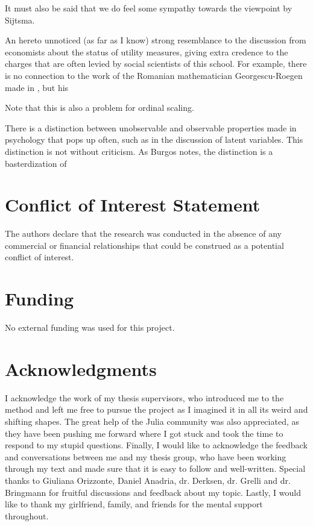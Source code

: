 \documentclass[utf8]{FrontiersinVancouver}
\begin{document}
It must also be said that we do feel some sympathy towards the viewpoint by Sijtsma\citep{sijtsmaPsychologicalMeasurementPhysics2012}. 

An hereto unnoticed (as far as I know) strong resemblance to the discussion from economists about the status of utility measures, giving extra credence to the charges that are often levied by social scientists of this school. For example, there is no connection to the work of the Romanian mathematician Georgescu-Roegen made in , but his 

Note that this is also a problem for ordinal scaling. 

There is a distinction between unobservable and observable properties made in psychology that pops up often, such as in the discussion of latent variables. This distinction is not without criticism. As Burgos notes, the distinction is a basterdization of 






\section*{Conflict of Interest Statement}
The authors declare that the research was conducted in the absence of any commercial or financial relationships that could be construed as a potential conflict of interest.

\section*{Funding}
No external funding was used for this project.

\section*{Acknowledgments}
I acknowledge the work of my thesis supervisors, who introduced me to the method and left me free to pursue the project as I imagined it in all its weird and shifting shapes.  The great help of the Julia community was also appreciated, as they have been pushing me forward where I got stuck and took the time to respond to my stupid questions. Finally, I would like to acknowledge the feedback and conversations between me and my thesis group, who have been working through my text and made sure that it is easy to follow and well-written. Special thanks to Giuliana Orizzonte, Daniel Anadria, dr. Derksen, dr. Grelli and dr. Bringmann for fruitful discussions and feedback about my topic. Lastly, I would like to thank my girlfriend, family, and friends for the mental support throughout.
\end{document}
